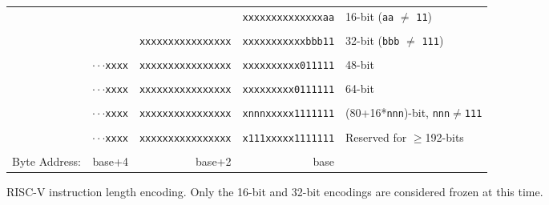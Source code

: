 \begin{figure}[hbt]
{
\begin{center}
\begin{tabular}{ccccl}
\cline{4-4}
& & & \multicolumn{1}{|c|}{\tt xxxxxxxxxxxxxxaa} & 16-bit ({\tt aa}
$\neq$ {\tt 11})\\
\cline{4-4}
\\
\cline{3-4}
& & \multicolumn{1}{|c|}{\tt xxxxxxxxxxxxxxxx}
& \multicolumn{1}{c|}{\tt xxxxxxxxxxxbbb11} & 32-bit ({\tt bbb}
$\neq$ {\tt 111}) \\
\cline{3-4}
\\
\cline{2-4}
\hspace{0.1in}
& \multicolumn{1}{c|}{$\cdot\cdot\cdot${\tt xxxx} }
& \multicolumn{1}{c|}{\tt xxxxxxxxxxxxxxxx}
& \multicolumn{1}{c|}{\tt xxxxxxxxxx011111} & 48-bit \\
\cline{2-4}
\\
\cline{2-4}
\hspace{0.1in}
& \multicolumn{1}{c|}{$\cdot\cdot\cdot${\tt xxxx} }
& \multicolumn{1}{c|}{\tt xxxxxxxxxxxxxxxx}
& \multicolumn{1}{c|}{\tt xxxxxxxxx0111111} & 64-bit \\
\cline{2-4}
\\
\cline{2-4}
\hspace{0.1in}
& \multicolumn{1}{c|}{$\cdot\cdot\cdot${\tt xxxx} }
& \multicolumn{1}{c|}{\tt xxxxxxxxxxxxxxxx}
& \multicolumn{1}{c|}{\tt xnnnxxxxx1111111} & (80+16*{\tt nnn})-bit,
       {\tt nnn}$\neq${\tt 111} \\
\cline{2-4}
\\
\cline{2-4}
\hspace{0.1in}
& \multicolumn{1}{c|}{$\cdot\cdot\cdot${\tt xxxx} }
& \multicolumn{1}{c|}{\tt xxxxxxxxxxxxxxxx}
& \multicolumn{1}{c|}{\tt x111xxxxx1111111} & Reserved for $\geq$192-bits \\
\cline{2-4}
\\
Byte Address: & \multicolumn{1}{r}{base+4} & \multicolumn{1}{r}{base+2} & \multicolumn{1}{r}{base} & \\
 \end{tabular}
\end{center}
}
\caption{RISC-V instruction length encoding.  Only the 16-bit and 32-bit encodings are considered frozen at this time.}
\label{instlengthcode}
\end{figure}

